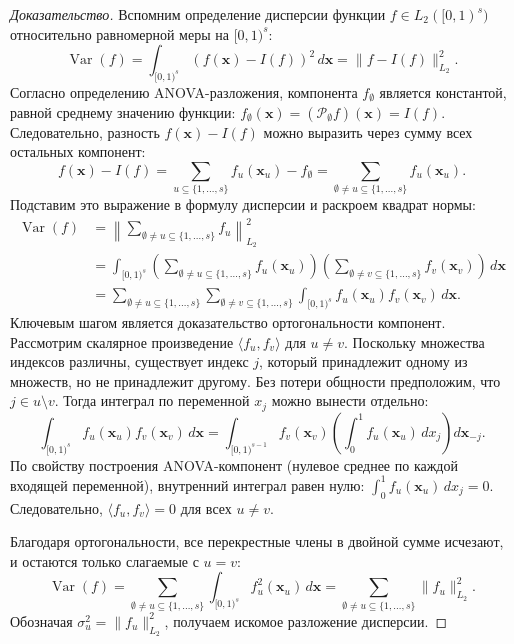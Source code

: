 \documentclass[12pt, a4paper]{article}
\theoremstyle{plain}
\theoremstyle{definition}
\theoremstyle{remark}
\DeclareMathOperator{\Var}{Var}
\newcommand{\II}{[0, 1)}
\newcommand{\Is}{\{1, \dots, s\}}
\newcommand{\vx}{\boldsymbol{x}}
\begin{document}
\begin{proof}[Доказательство]
    Вспомним определение дисперсии функции $f \in L_2(\II^s)$ относительно равномерной меры на $\II^s$:
    \begin{equation}
        \Var(f) = \int_{\II^s} \left( f(\vx) - I(f) \right)^2 \, d\vx = \|f - I(f)\|_{L_2}^2.
    \end{equation}
    Согласно определению ANOVA-разложения, компонента $f_\emptyset$ является константой, равной среднему значению функции: $f_\emptyset(\vx) = (\mathcal{P}_\emptyset f)(\vx) = I(f)$. Следовательно, разность $f(\vx) - I(f)$ можно выразить через сумму всех остальных компонент:
    \begin{equation}
        f(\vx) - I(f) = \sum_{u \subseteq \Is} f_u(\vx_u) - f_\emptyset = \sum_{\emptyset \neq u \subseteq \Is} f_u(\vx_u).
    \end{equation}
    Подставим это выражение в формулу дисперсии и раскроем квадрат нормы:
    \begin{align}
        \Var(f) &= \left\| \sum_{\emptyset \neq u \subseteq \Is} f_u \right\|_{L_2}^2 \\
        &= \int_{\II^s} \left( \sum_{\emptyset \neq u \subseteq \Is} f_u(\vx_u) \right) \left( \sum_{\emptyset \neq v \subseteq \Is} f_v(\vx_v) \right) \, d\vx \\
        &= \sum_{\emptyset \neq u \subseteq \Is} \sum_{\emptyset \neq v \subseteq \Is} \int_{\II^s} f_u(\vx_u) f_v(\vx_v) \, d\vx.
    \end{align}
    Ключевым шагом является доказательство ортогональности компонент. Рассмотрим скалярное произведение $\langle f_u, f_v \rangle$ для $u \neq v$. Поскольку множества индексов различны, существует индекс $j$, который принадлежит одному из множеств, но не принадлежит другому. Без потери общности предположим, что $j \in u \setminus v$. Тогда интеграл по переменной $x_j$ можно вынести отдельно:
    \begin{equation}
        \int_{\II^s} f_u(\vx_u) f_v(\vx_v) \, d\vx = \int_{\II^{s-1}} f_v(\vx_v) \left( \int_0^1 f_u(\vx_u) \, dx_j \right) d\vx_{-j}.
    \end{equation}
    По свойству построения ANOVA-компонент (нулевое среднее по каждой входящей переменной), внутренний интеграл равен нулю: $\int_0^1 f_u(\vx_u) \, dx_j = 0$. Следовательно, $\langle f_u, f_v \rangle = 0$ для всех $u \neq v$.

    Благодаря ортогональности, все перекрестные члены в двойной сумме исчезают, и остаются только слагаемые с $u=v$:
    \begin{equation}
        \Var(f) = \sum_{\emptyset \neq u \subseteq \Is} \int_{\II^s} f_u^2(\vx_u) \, d\vx = \sum_{\emptyset \neq u \subseteq \Is} \|f_u\|_{L_2}^2.
    \end{equation}
    Обозначая $\sigma_u^2 = \|f_u\|_{L_2}^2$, получаем искомое разложение дисперсии.
\end{proof}
\end{document}
